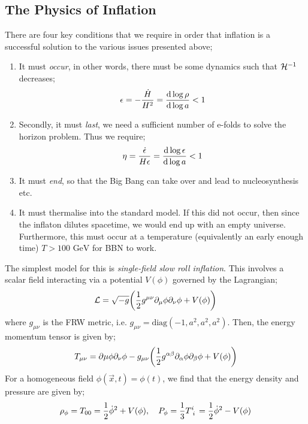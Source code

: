 \subsection{The Physics of Inflation}
There are four key conditions that we require in order that inflation is a successful solution to the various issues presented above;
\begin{enumerate}
\item It must \emph{occur}, in other words, there must be some dynamics such that $\mathcal{H}^{-1}$ decreases;
\begin{equation*}
\epsilon = -\frac{\dot{H}}{H^2} = \frac{\text{d} \log \rho}{\text{d} \log a} < 1
\end{equation*}
\item Secondly, it must \emph{last}, we need a sufficient number of e-folds to solve the horizon problem. Thus we require;
\begin{equation*}
\eta = \frac{\dot{\epsilon}}{H \epsilon} = \frac{\text{d} \log \epsilon}{\text{d} \log a} < 1
\end{equation*}
\item It must \emph{end}, so that the Big Bang can take over and lead to nucleosynthesis etc.
\item It must thermalise into the standard model. If this did not occur, then since the inflaton dilutes spacetime, we would end up with an empty universe. Furthermore, this must occur at a temperature (equivalently an early enough time) $T > 100\,\,\text{GeV}$ for BBN to work.
\end{enumerate}
The simplest model for this is \emph{single-field slow roll inflation}. This involves a scalar field interacting via a potential $V(\phi)$ governed by the Lagrangian;
\begin{equation*}
\mL = \sqrt{-g}\left(\frac{1}{2}g^{\mu\nu}\del_\mu \phi \del_\nu \phi + V(\phi)\right)
\end{equation*}
where $g_{\mu\nu}$ is the FRW metric, i.e. $g_{\mu\nu} = \text{diag}(-1, a^2, a^2, a^2)$. Then, the energy momentum tensor is given by;
\begin{equation}
T_{\mu\nu} = \del\mu \phi \del_\nu \phi - g_{\mu\nu}\left(\frac{1}{2}g^{\alpha \beta}\del_\alpha \phi \del_\beta \phi + V(\phi)\right)
\end{equation}
For a homogeneous field $\phi(\vec{x}, t) = \phi(t)$, we find that the energy density and pressure are given by;
\begin{equation}
\rho_\phi = T_{00} = \frac{1}{2}\dot{\phi}^2 + V(\phi), \quad P_{\phi} = \frac{1}{3}T\indices{^{i}_{i}} = \frac{1}{2}\dot{\phi}^2 - V(\phi)
\end{equation}
